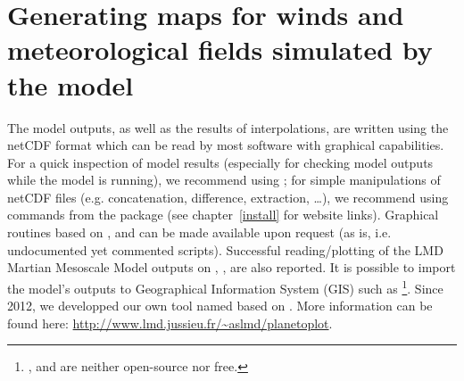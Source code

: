 \scriptsize
{}
\normalsize

\mk
\section{Generating maps for winds and meteorological fields simulated by the model}\label{plots}

\sk
The model outputs, as well as the results of  interpolations, are written using the netCDF format which can be read by most software with graphical capabilities. For a quick inspection of model results (especially for checking model outputs while the model is running), we recommend using ; for simple manipulations of netCDF files (e.g. concatenation, difference, extraction, \ldots), we recommend using commands from the  package (see chapter~\ref{install} for website links). Graphical routines based on ,  and  can be made available upon request (as is, i.e. undocumented yet commented scripts). Successful reading/plotting of the LMD Martian Mesoscale Model outputs on , ,  are also reported. It is possible to import the model's outputs to Geographical Information System (GIS) such as \footnote{,  and  are neither open-source nor free.}. Since 2012, we developped our own tool named  based on . More information can be found here: \url{http://www.lmd.jussieu.fr/~aslmd/planetoplot}.

